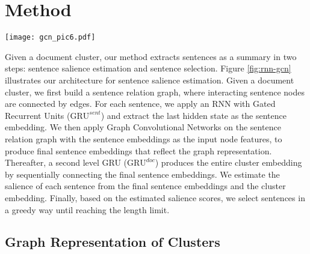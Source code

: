 \documentclass[11pt,a4paper]{article}
\begin{document}
\section{Method}
\begin{figure*}[t]
\hspace{-2mm}\texttt{[image: gcn\_pic6.pdf]}
  \caption{Illustration of our architecture for sentence salience estimation.
  In this example, there are two documents in the cluster and each document has two sentences.
  Sentences are processed by the $\mathrm{GRU}^{sent}$ to get input sentence embeddings.
  The GCN takes the input sentence embeddings and the sentence relation graph, and outputs high-level hidden features for individual sentences.
  $\mathrm{GRU}^{doc}$ produces the cluster embedding from the output sentence embeddings.
  The salience is estimated from the output sentence embeddings and the cluster embedding.
  $w_i$: the word embedding for $i$-th word.
  $h_i$: the hidden state of $\mathrm{GRU}$ at $i$-th step.
  }
  \label{fig:rnn-gcn}
  \vspace{-5mm}
\end{figure*}
Given a document cluster, our method extracts sentences as a summary in two steps: sentence salience estimation and sentence selection.
Figure \ref{fig:rnn-gcn} illustrates our architecture for sentence salience estimation.
Given a document cluster, we first build a sentence relation graph, where interacting sentence nodes are connected by edges. 
For each sentence, we apply an RNN with Gated Recurrent Units ($\mathrm{GRU}^{sent}$) \cite{cho-EtAl:2014:EMNLP2014,chung2014empirical} and extract the last hidden state as the sentence embedding.
We then apply Graph Convolutional Networks \cite{kipf2017semi} on the sentence relation graph with the sentence embeddings as the input node features, to produce final sentence embeddings that reflect the graph representation.
Thereafter, a second level GRU ($\mathrm{GRU}^{doc}$) produces the entire cluster embedding by sequentially connecting the final sentence embeddings.
We estimate the salience of each sentence from the final sentence embeddings and the cluster embedding.
Finally, based on the estimated salience scores, we select sentences in a greedy way until reaching the length limit.

\subsection{Graph Representation of Clusters}
\end{document}
